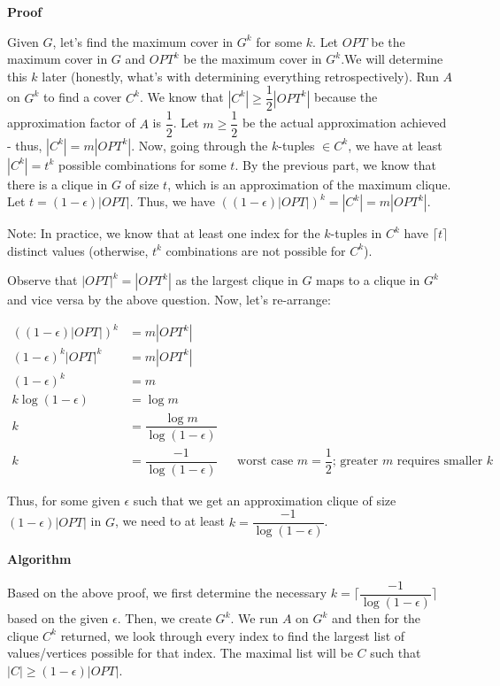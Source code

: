 \documentclass{article}
\begin{document}
\textbf{Proof}

Given $G$, let's find the maximum cover in $G^k$ for some $k$. Let $OPT$ be the maximum cover in $G$ and $OPT^k$ be the
maximum cover in $G^k$.We will determine this $k$ later (honestly, what's with determining everything retrospectively).
Run $A$ on $G^k$ to find a cover $C^k$. We know that $|C^k| \geq \dfrac{1}{2}|OPT^k|$ because the approximation factor of
$A$ is $\dfrac{1}{2}$. Let $m \geq \dfrac{1}{2}$ be the actual approximation achieved - thus, $|C^k| = m |OPT^k|$. Now,
going through the $k$-tuples $\in C^k$, we have at least $|C^k| = t^k$ possible combinations for some $t$. By the
previous part, we know that there is a clique in $G$ of size $t$, which is an approximation of the maximum clique. Let
$t = (1 - \epsilon)|OPT|$. Thus, we have $((1 - \epsilon)|OPT|)^k = |C^k| = m |OPT^k|$.

Note: In practice, we know that at least one index for the $k$-tuples in $C^k$ have $\lceil t \rceil$ distinct values
(otherwise, $t^k$ combinations are not possible for $C^k$).

Observe that $|OPT|^k = |OPT^k|$ as the largest clique in $G$ maps to a clique in $G^k$ and vice
versa by the above question. Now, let's re-arrange:

\begin{align*}
    ((1 - \epsilon)|OPT|)^k &= m|OPT^k| \\
    (1 - \epsilon)^k |OPT|^k &= m|OPT^k| \\
    (1 - \epsilon)^k  &= m \\
    k \log(1 - \epsilon)  &= \log m \\
    k &=\dfrac{\log m}{\log(1 - \epsilon)} \\
    k &= \dfrac{-1}{\log(1 - \epsilon)} && \text{worst case $m = \dfrac{1}{2}$; greater $m$ requires smaller $k$}
\end{align*}

Thus, for some given $\epsilon$ such that we get an approximation clique of size $(1 - \epsilon)|OPT|$ in $G$, we need
to at least $k = \dfrac{-1}{\log(1- \epsilon)}$.


\textbf{Algorithm}

Based on the above proof, we first determine the necessary $k = \lceil \dfrac{-1}{\log(1 - \epsilon)} \rceil$ based on
the given $\epsilon$. Then, we create $G^k$. We run $A$ on $G^k$ and then for the clique $C^k$ returned, we look through
every index to find the largest list of values/vertices possible for that index. The maximal list will be $C$ such that
$|C| \geq (1 - \epsilon)|OPT|$.
\end{document}
